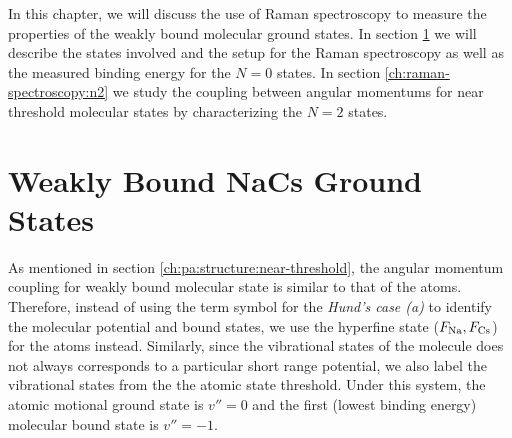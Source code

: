 In this chapter, we will discuss the use of Raman spectroscopy
to measure the properties of the weakly bound molecular ground states.
In section \ref{ch:raman-spectroscopy:states}
we will describe the states involved and the setup for the Raman spectroscopy
as well as the measured binding energy for the $N=0$ states.
In section \ref{ch:raman-spectroscopy:n2}
we study the coupling between angular momentums for near threshold molecular states
by characterizing the $N=2$ states.

\section{Weakly Bound NaCs Ground States}
\label{ch:raman-spectroscopy:states}

As mentioned in section \ref{ch:pa:structure:near-threshold},
the angular momentum coupling for weakly bound molecular state is similar to that of the atoms.
Therefore, instead of using the term symbol for the \textit{Hund's case (a)}
to identify the molecular potential and bound states,
we use the hyperfine state ($F_{\mathrm{Na}}, F_{\mathrm{Cs}}$) for the atoms instead.
Similarly, since the vibrational states of the molecule does not always corresponds to
a particular short range potential, we also label the vibrational states
from the the atomic state threshold.
Under this system, the atomic motional ground state is $v''=0$ and
the first (lowest binding energy) molecular bound state is $v''=-1$.

